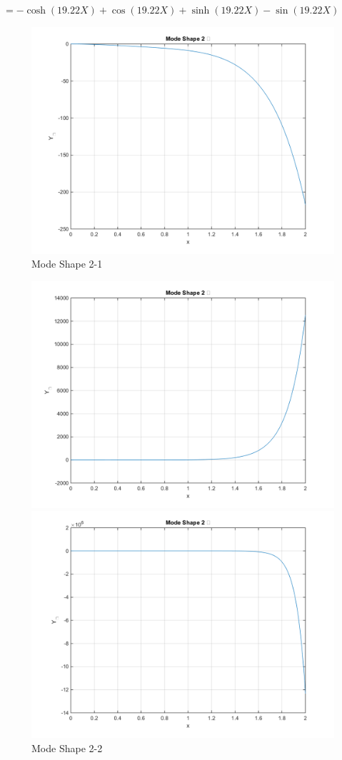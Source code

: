 \documentclass[14pt,a4paper]{article}
\begin{document}
\begin{enumerate}
	\hspace*{0.9cm} $= -\cosh(19.22X) + \cos(19.22X) + \sinh(19.22X) - \sin(19.22X)$
	\begin{figure}[htp]
		\centering
		\includegraphics[scale=0.5]{hw2_VB2_mode1.png}
		\caption{Mode Shape 2-1}
	\end{figure}
	\begin{figure}[htp]
		\centering
		\includegraphics[scale=0.5]{hw2_VB2_mode2.png}
		\caption{Mode Shape 2-2}
		\includegraphics[scale=0.5]{hw2_VB2_mode3.png}

\end{figure}
\end{enumerate}
\end{document}
